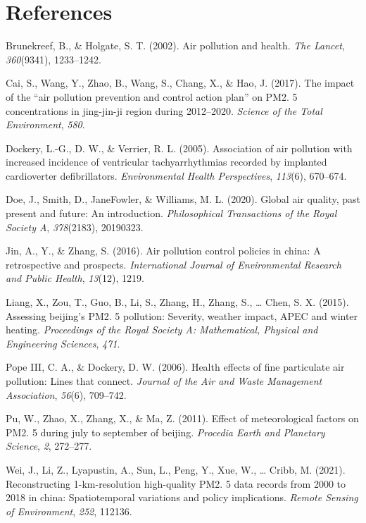 \documentclass[
  12pt,
]{article}
\newlength{\cslhangindent}
\newlength{\cslentryspacingunit} %
\newenvironment{CSLReferences}[2] %
 {%
  \setlength{\parindent}{0pt}
  \ifodd #1
  \let\oldpar\par
  \def\par{\hangindent=\cslhangindent\oldpar}
  \fi
  \setlength{\parskip}{#2\cslentryspacingunit}
 }%
 {}
\begin{document}
\newpage

\hypertarget{references}{%
\section*{References}\label{references}}

\hypertarget{refs}{}
\begin{CSLReferences}{1}{0}
\leavevmode{}%
Brunekreef, B., \& Holgate, S. T. (2002). Air pollution and health.
\emph{The Lancet}, \emph{360}(9341), 1233--1242.

\leavevmode{}%
Cai, S., Wang, Y., Zhao, B., Wang, S., Chang, X., \& Hao, J. (2017). The
impact of the {``air pollution prevention and control action plan''} on
PM2. 5 concentrations in jing-jin-ji region during 2012--2020.
\emph{Science of the Total Environment}, \emph{580}.

\leavevmode{}%
Dockery, L.-G., D. W., \& Verrier, R. L. (2005). Association of air
pollution with increased incidence of ventricular tachyarrhythmias
recorded by implanted cardioverter defibrillators. \emph{Environmental
Health Perspectives}, \emph{113}(6), 670--674.

\leavevmode{}%
Doe, J., Smith, D., JaneFowler, \& Williams, M. L. (2020). Global air
quality, past present and future: An introduction. \emph{Philosophical
Transactions of the Royal Society A}, \emph{378}(2183), 20190323.

\leavevmode{}%
Jin, A., Y., \& Zhang, S. (2016). Air pollution control policies in
china: A retrospective and prospects. \emph{International Journal of
Environmental Research and Public Health}, \emph{13}(12), 1219.

\leavevmode{}%
Liang, X., Zou, T., Guo, B., Li, S., Zhang, H., Zhang, S., \ldots{}
Chen, S. X. (2015). Assessing beijing's PM2. 5 pollution: Severity,
weather impact, APEC and winter heating. \emph{Proceedings of the Royal
Society A: Mathematical, Physical and Engineering Sciences}, \emph{471}.

\leavevmode{}%
Pope III, C. A., \& Dockery, D. W. (2006). Health effects of fine
particulate air pollution: Lines that connect. \emph{Journal of the Air
and Waste Management Association}, \emph{56}(6), 709--742.

\leavevmode{}%
Pu, W., Zhao, X., Zhang, X., \& Ma, Z. (2011). Effect of meteorological
factors on PM2. 5 during july to september of beijing. \emph{Procedia
Earth and Planetary Science}, \emph{2}, 272--277.

\leavevmode{}%
Wei, J., Li, Z., Lyapustin, A., Sun, L., Peng, Y., Xue, W., \ldots{}
Cribb, M. (2021). Reconstructing 1-km-resolution high-quality PM2. 5
data records from 2000 to 2018 in china: Spatiotemporal variations and
policy implications. \emph{Remote Sensing of Environment}, \emph{252},
112136.

\end{CSLReferences}
\end{document}
